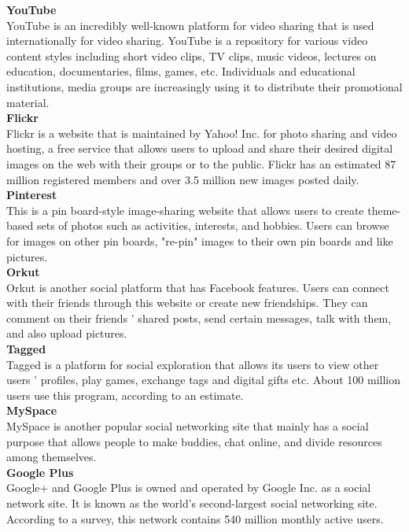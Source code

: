 \documentclass[12pt]{report}
\begin{document}
	\textbf{YouTube} \\
	YouTube is an incredibly well-known platform for video sharing that is used internationally for video sharing. YouTube is a repository for various video content styles including short video clips, TV clips, music videos, lectures on education, documentaries, films, games, etc. Individuals and educational institutions, media groups are increasingly using it to distribute their promotional material.\\
	
	\textbf{Flickr}\\
	Flickr is a website that is maintained by Yahoo! Inc. for photo sharing and video hosting, a free service that allows users to upload and share their desired digital images on the web with their groups or to the public. Flickr has an estimated 87 million registered members and over 3.5 million new images posted daily.\\
	
	\textbf{Pinterest} \\
	This is a pin board-style image-sharing website that allows users to create theme-based sets of photos such as activities, interests, and hobbies. Users can browse for images on other pin boards, "re-pin" images to their own pin boards and like pictures.\\
	
	\textbf{Orkut} \\
	Orkut is another social platform that has Facebook features. Users can connect with their friends through this website or create new friendships. They can comment on their friends ' shared posts, send certain messages, talk with them, and also upload pictures.\\
	
	\textbf{Tagged} \\
	Tagged is a platform for social exploration that allows its users to view other users ' profiles, play games, exchange tags and digital gifts etc. About 100 million users use this program, according to an estimate.\\
	
	\textbf{MySpace} \\
	MySpace is another popular social networking site that mainly has a social purpose that allows people to make buddies, chat online, and divide resources among themselves.\\
	
	\textbf{Google Plus} \\
	Google+ and Google Plus is owned and operated by Google Inc. as a social network site. It is known as the world's second-largest social networking site. According to a survey, this network contains 540 million monthly active users.\\
	
\end{document}
